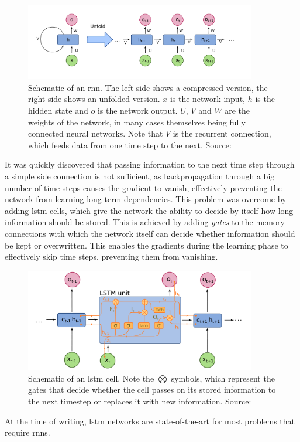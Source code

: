 \begin{figure}
  \centering
  \includegraphics[width=0.9\textwidth]{../assets/background/Recurrent_neural_network_unfold.pdf}
  \caption[Schematic of an \gls{rnn}]{Schematic of an \gls{rnn}. The left side shows a compressed version, the right side shows an unfolded version. $x$ is the network input, $h$ is the hidden state and $o$ is the network output. $U$, $V$ and $W$ are the weights of the network, in many cases themselves being fully connected neural networks. Note that $V$ is the recurrent connection, which feeds data from one time step to the next. Source:~\cite{rnnWikipedia}}
  \label{fig:rnn}
\end{figure}

It was quickly discovered that passing information to the next time step through a simple side connection is not sufficient, as backpropagation through a big number of time steps causes the gradient to vanish, effectively preventing the network from learning long term dependencies. This problem was overcome by adding \gls{lstm} cells, which give the network the ability to decide by itself how long information should be stored. This is achieved by adding \emph{gates} to the memory connections with which the network itself can decide whether information should be kept or overwritten. This enables the gradients during the learning phase to effectively skip time steps, preventing them from vanishing.

\begin{figure}
  \centering
  \includegraphics[width=0.9\textwidth]{../assets/background/Long_Short-Term_Memory.pdf}
  \caption[Schematic of an \gls{lstm} cell]{Schematic of an \gls{lstm} cell. Note the $\bigotimes$ symbols, which represent the gates that decide whether the cell passes on its stored information to the next timestep or replaces it with new information. Source:~\cite{rnnWikipedia}}
  \label{fig:lstm}
\end{figure}

At the time of writing, \gls{lstm} networks are state-of-the-art for most problems that require \glspl{rnn}.


